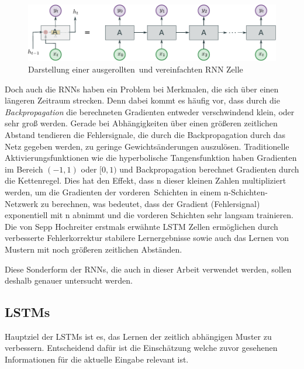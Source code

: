                 \begin{figure}[ht]
                    \centering
                    \includegraphics[width=1\textwidth]{images/Illustrationen/RNN_enrolled}
                    \caption[Alternative Darstellung einer \ac{RNN} Zelle]{Darstellung einer \glqq ausgerollten\grqq \ und vereinfachten \ac{RNN} Zelle}
                    \label{fig:RNN_enroled}
                \end{figure}
                Doch auch die \acp{RNN} haben ein Problem bei Merkmalen, die sich über einen längeren Zeitraum strecken.
            Denn dabei kommt es häufig vor, dass durch die \textit{Backpropagation} die berechneten Gradienten entweder verschwindend klein, oder sehr groß werden.
            Gerade bei Abhängigkeiten über einen größeren zeitlichen Abstand tendieren die Fehlersignale,
            die durch die Backpropagation durch das Netz gegeben werden, zu geringe Gewichtsänderungen auszulösen.
            Traditionelle Aktivierungsfunktionen wie die hyperbolische Tangensfunktion haben Gradienten im Bereich $(-1,1)$ oder $[0,1)$ und Backpropagation berechnet Gradienten durch die Kettenregel.
            Dies hat den Effekt, dass n dieser kleinen Zahlen multipliziert werden, um die Gradienten der \glqq vorderen\grqq \ Schichten in einem n-Schichten-Netzwerk zu berechnen, was bedeutet, dass der Gradient (Fehlersignal) exponentiell mit n abnimmt und die vorderen Schichten sehr langsam trainieren.
            Die von Sepp Hochreiter erstmals erwähnte  \ac{LSTM} Zellen ermöglichen durch verbesserte Fehlerkorrektur stabilere Lernergebnisse sowie auch das Lernen von Mustern mit noch größeren zeitlichen Abständen.~\cite{HOCHREITER1998}

            Diese Sonderform der \acp{RNN}, die auch in dieser Arbeit verwendet werden, sollen deshalb genauer untersucht werden.
   	
        \subsection{\aclp{LSTM}}\label{sec:LSTM}
            Hauptziel der \acp{LSTM} ist es, das Lernen der zeitlich abhängigen Muster zu verbessern.
            Entscheidend dafür ist die Einschätzung welche zuvor gesehenen Informationen für die aktuelle Eingabe relevant ist.
            
